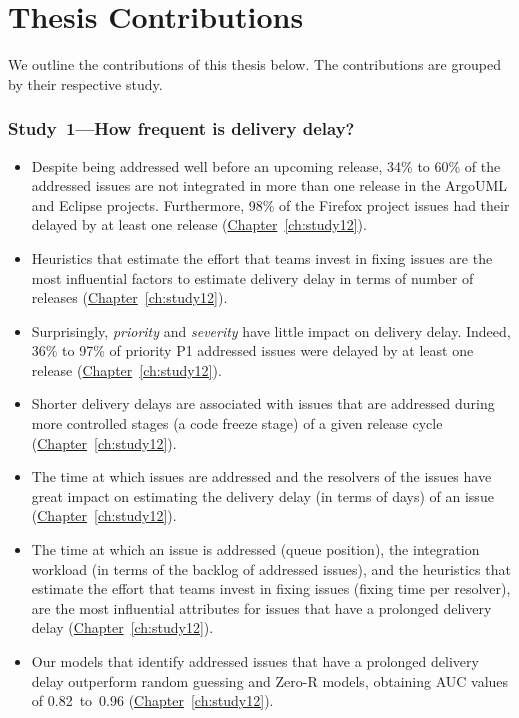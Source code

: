 \DIFaddend \section{Thesis Contributions}

We outline the contributions of this thesis below. The contributions are grouped
by their respective study.

\subsubsection*{Study~1---How frequent is delivery delay?}

\begin{itemize}

	\item Despite being addressed well before an upcoming release, 34\% to
		60\% of the addressed issues are not integrated in more than one
		release in the ArgoUML and Eclipse projects. Furthermore, 98\%
		of the Firefox project issues had their \DIFdelbegin {}\DIFdelend \DIFaddbegin {}\DIFaddend delayed by
		at least one release
		(\hyperref[ch:study12]{Chapter}~\ref{ch:study12}).

	\item Heuristics that estimate the effort that teams invest in
		fixing issues are the most influential factors to
		estimate delivery delay in terms of number of releases
		(\hyperref[ch:study12]{Chapter}~\ref{ch:study12}).

	\item Surprisingly, \textit{priority} and \textit{severity} have little
		impact on delivery delay. Indeed, 36\% to 97\% of priority P1
		addressed issues were delayed by at least one release
		(\hyperref[ch:study12]{Chapter}~\ref{ch:study12}).

	\item Shorter delivery delays are associated with issues that are
		addressed during more controlled stages (\eg a code freeze
		stage) of a given release cycle
		(\hyperref[ch:study12]{Chapter}~\ref{ch:study12}).

	\item The time at which issues are addressed and the resolvers
		of the issues have great impact on estimating the
		delivery delay (in terms of days) of an issue
		(\hyperref[ch:study12]{Chapter}~\ref{ch:study12}).

	\item The time at which an issue is addressed (queue position), the
		integration workload (in terms of the backlog of addressed
		issues), and the heuristics that estimate the effort that teams
		invest in fixing issues (fixing time per resolver), are the most
		influential attributes for issues that have a prolonged delivery
		delay (\hyperref[ch:study12]{Chapter}~\ref{ch:study12}). 

	\item Our models that identify addressed issues that have a prolonged
		delivery delay outperform random guessing and Zero-R models,
		obtaining AUC values of 0.82~to~0.96
		(\hyperref[ch:study12]{Chapter}~\ref{ch:study12}).

\end{itemize}

